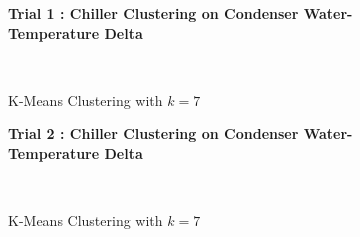 \begin{figure}[!h]
\centerline{\bfseries\Large Trial 1 : Chiller Clustering on Condenser Water-Temperature Delta}\\
\caption{K-Means Clustering with $k=7$}
\end{figure}
\begin{figure}[!h]
\centerline{\bfseries\Large Trial 2 : Chiller Clustering on Condenser Water-Temperature Delta}\\
\caption{K-Means Clustering with $k=7$}
\end{figure}
